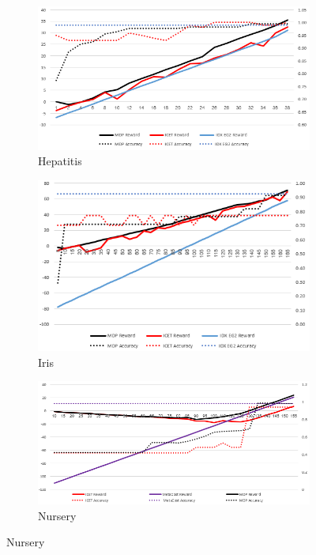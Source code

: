 \documentclass[letterpaper]{article}
\theoremstyle{definition}
\begin{document}
\begin{figure}[ht]
	\centering
	
    \quad
    \begin{subfigure}[t]{0.45\textwidth}\vskip 0pt
		\centering
		\includegraphics[scale=0.4]{Hepatitis}
		\caption{Hepatitis}\label{fig:Hepatitis}		
	\end{subfigure}
    \quad
        \begin{subfigure}[t]{0.45\textwidth}\vskip 0pt
		\centering
		\includegraphics[scale=0.45]{Iris}
		\caption{Iris}\label{fig:Iris}		
	\end{subfigure}
    \quad
    \begin{subfigure}[t]{0.45\textwidth}\vskip 0pt
		\centering
		\includegraphics[scale=0.5]{Nursery}
		\caption{Nursery}\label{fig:Nursery}		
	\end{subfigure}
   

\end{figure}
\end{document}
